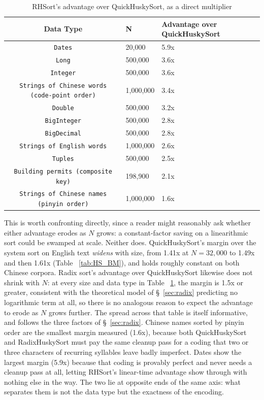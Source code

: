 \documentclass[twoside,leqno,twocolumn]{article}
\begin{document}
\begin{table}
  \caption{RHSort's advantage over QuickHuskySort, as a direct multiplier}
  \label{tab:RadixImprovements}
  \begin{tabular}{cll}
    \toprule
    Data Type & N & Advantage over QuickHuskySort \\
    \midrule
    \texttt{Dates} & 20,000 & 5.9x \\
    \texttt{Long} & 500,000 & 3.6x \\
    \texttt{Integer} & 500,000 & 3.6x \\
    \texttt{Strings of Chinese words (code-point order)} & 1,000,000 & 3.4x \\
    \texttt{Double} & 500,000 & 3.2x \\
    \texttt{BigInteger} & 500,000 & 2.8x \\
    \texttt{BigDecimal} & 500,000 & 2.8x \\
    \texttt{Strings of English words} & 1,000,000 & 2.6x \\
    \texttt{Tuples} & 500,000 & 2.5x \\
    \texttt{Building permits (composite key)} & 198,900 & 2.1x \\
    \texttt{Strings of Chinese names (pinyin order)} & 1,000,000 & 1.6x \\
    \bottomrule
  \end{tabular}
\end{table}

This is worth confronting directly, since a reader might reasonably ask whether either advantage erodes
as $N$ grows: a constant-factor saving on a linearithmic sort could be swamped at scale.
Neither does.
QuickHuskySort's margin over the system sort on English text \emph{widens} with size,
from 1.41x at $N=32{,}000$ to 1.49x and then 1.61x (Table ~\ref{tab:HS_BM}),
and holds roughly constant on both Chinese corpora.
Radix sort's advantage over QuickHuskySort likewise does not shrink with $N$:
at every size and data type in Table ~\ref{tab:RadixImprovements}, the margin is 1.5x or greater,
consistent with the theoretical model of \S~\ref{sec:radix} predicting no logarithmic term at all,
so there is no analogous reason to expect the advantage to erode as $N$ grows further.
The spread across that table is itself informative, and follows the three factors of \S~\ref{sec:radix}.
Chinese names sorted by pinyin order are the smallest margin measured (1.6x),
because both QuickHuskySort and RadixHuskySort must pay the same cleanup pass for a coding
that two or three characters of recurring syllables leave badly imperfect.
Dates show the largest margin (5.9x) because that coding is provably perfect and never needs a cleanup pass at all,
letting RHSort's linear-time advantage show through with nothing else in the way.
The two lie at opposite ends of the same axis: what separates them is not the data type but the exactness of the encoding.
\end{document}
